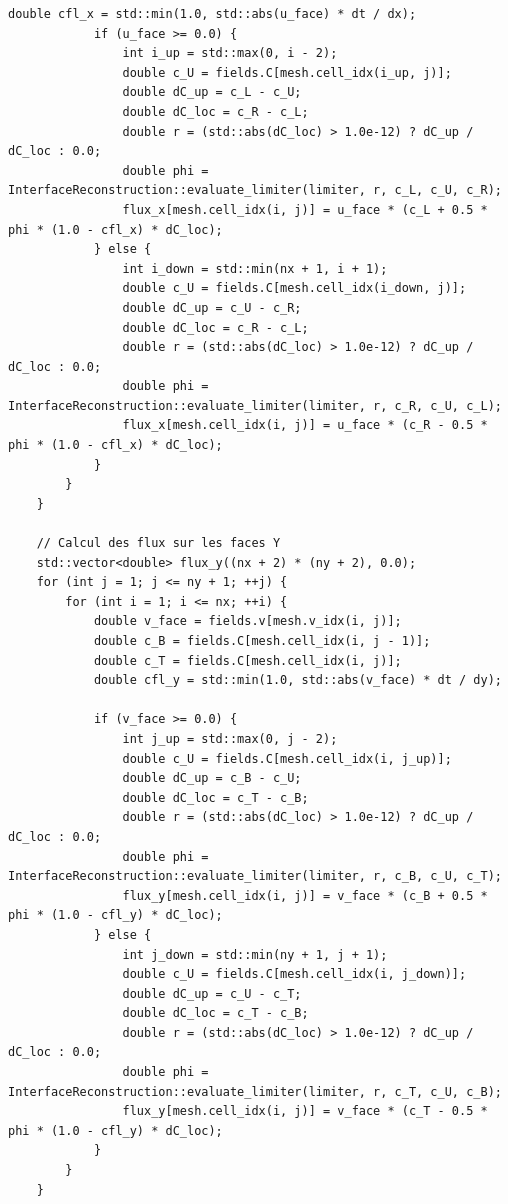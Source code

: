 \documentclass[10pt,a4paper,oneside]{book}
\begin{document}
\begin{lstlisting}[language={[11]C++}]
            double cfl_x = std::min(1.0, std::abs(u_face) * dt / dx);
            if (u_face >= 0.0) {
                int i_up = std::max(0, i - 2);
                double c_U = fields.C[mesh.cell_idx(i_up, j)];
                double dC_up = c_L - c_U;
                double dC_loc = c_R - c_L;
                double r = (std::abs(dC_loc) > 1.0e-12) ? dC_up / dC_loc : 0.0;
                double phi = InterfaceReconstruction::evaluate_limiter(limiter, r, c_L, c_U, c_R);
                flux_x[mesh.cell_idx(i, j)] = u_face * (c_L + 0.5 * phi * (1.0 - cfl_x) * dC_loc);
            } else {
                int i_down = std::min(nx + 1, i + 1);
                double c_U = fields.C[mesh.cell_idx(i_down, j)];
                double dC_up = c_U - c_R;
                double dC_loc = c_R - c_L;
                double r = (std::abs(dC_loc) > 1.0e-12) ? dC_up / dC_loc : 0.0;
                double phi = InterfaceReconstruction::evaluate_limiter(limiter, r, c_R, c_U, c_L);
                flux_x[mesh.cell_idx(i, j)] = u_face * (c_R - 0.5 * phi * (1.0 - cfl_x) * dC_loc);
            }
        }
    }

    // Calcul des flux sur les faces Y
    std::vector<double> flux_y((nx + 2) * (ny + 2), 0.0);
    for (int j = 1; j <= ny + 1; ++j) {
        for (int i = 1; i <= nx; ++i) {
            double v_face = fields.v[mesh.v_idx(i, j)];
            double c_B = fields.C[mesh.cell_idx(i, j - 1)];
            double c_T = fields.C[mesh.cell_idx(i, j)];
            double cfl_y = std::min(1.0, std::abs(v_face) * dt / dy);

            if (v_face >= 0.0) {
                int j_up = std::max(0, j - 2);
                double c_U = fields.C[mesh.cell_idx(i, j_up)];
                double dC_up = c_B - c_U;
                double dC_loc = c_T - c_B;
                double r = (std::abs(dC_loc) > 1.0e-12) ? dC_up / dC_loc : 0.0;
                double phi = InterfaceReconstruction::evaluate_limiter(limiter, r, c_B, c_U, c_T);
                flux_y[mesh.cell_idx(i, j)] = v_face * (c_B + 0.5 * phi * (1.0 - cfl_y) * dC_loc);
            } else {
                int j_down = std::min(ny + 1, j + 1);
                double c_U = fields.C[mesh.cell_idx(i, j_down)];
                double dC_up = c_U - c_T;
                double dC_loc = c_T - c_B;
                double r = (std::abs(dC_loc) > 1.0e-12) ? dC_up / dC_loc : 0.0;
                double phi = InterfaceReconstruction::evaluate_limiter(limiter, r, c_T, c_U, c_B);
                flux_y[mesh.cell_idx(i, j)] = v_face * (c_T - 0.5 * phi * (1.0 - cfl_y) * dC_loc);
            }
        }
    }


\end{lstlisting}
\end{document}
